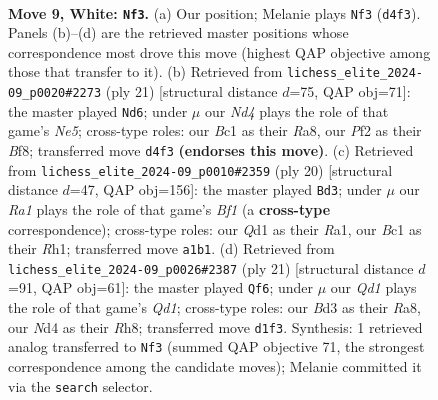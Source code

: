 \documentclass[11pt]{article}
\begin{document}
\clearpage

\begin{figure}[p]\centering
\begin{subfigure}{0.46\textwidth}\centering
\resizebox{\linewidth}{!}{%
\newchessgame
\chessboard[
  setfen={rnb2rk1/pp3ppp/4pn2/3q4/1b1N4/2NBP3/PP3PPP/R1BQK2R w KQ - 0 9},
  showmover=false,
  pgfstyle=straightmove, color=movearrow, markmove={d4-f3}
]}
\caption{}
\end{subfigure}\hfill
\begin{subfigure}{0.46\textwidth}\centering
\resizebox{\linewidth}{!}{%
\newchessgame
\chessboard[
  setfen={r2qkb1r/ppp3p1/2n4p/1B3b2/4n3/2N2Q2/PPP2PPP/R1B2RK1 b kq - 1 11},
  showmover=false,
  pgfstyle=straightmove, color=movearrow, markmove={e4-d6}
]}
\caption{}
\end{subfigure}
\\[4pt]
\begin{subfigure}{0.46\textwidth}\centering
\resizebox{\linewidth}{!}{%
\newchessgame
\chessboard[
  setfen={rnb2rk1/pp3pp1/4pn1p/8/1b1Nq2B/2N1P3/PPQ2PPP/R3KB1R w KQ - 1 11},
  showmover=false,
  pgfstyle=straightmove, color=movearrow, markmove={f1-d3}
]}
\caption{}
\end{subfigure}\hfill
\begin{subfigure}{0.46\textwidth}\centering
\resizebox{\linewidth}{!}{%
\newchessgame
\chessboard[
  setfen={r2qk2r/pp3pQp/4b3/2pn4/1b6/2N3P1/PP2PPBP/R1B1K2R b KQkq - 0 11},
  showmover=false,
  pgfstyle=straightmove, color=movearrow, markmove={d8-f6}
]}
\caption{}
\end{subfigure}
\caption{\textbf{Move 9, White: \texttt{Nf3}.} (a) Our position; Melanie plays \texttt{Nf3} (\texttt{d4f3}). Panels (b)--(d) are the retrieved master positions whose correspondence most drove this move (highest QAP objective among those that transfer to it). (b) Retrieved from \texttt{lichess\_elite\_2024-09\_p0020\#2273} (ply 21) [structural distance $d$=75, QAP obj=71]: the master played \texttt{Nd6}; under $\mu$ our \emph{Nd4} plays the role of that game's \emph{Ne5}; cross-type roles: our \emph{B}c1 as their \emph{R}a8, our \emph{P}f2 as their \emph{B}f8; transferred move \texttt{d4f3} \textbf{(endorses this move)}. (c) Retrieved from \texttt{lichess\_elite\_2024-09\_p0010\#2359} (ply 20) [structural distance $d$=47, QAP obj=156]: the master played \texttt{Bd3}; under $\mu$ our \emph{Ra1} plays the role of that game's \emph{Bf1} (a \textbf{cross-type} correspondence); cross-type roles: our \emph{Q}d1 as their \emph{R}a1, our \emph{B}c1 as their \emph{R}h1; transferred move \texttt{a1b1}. (d) Retrieved from \texttt{lichess\_elite\_2024-09\_p0026\#2387} (ply 21) [structural distance $d$=91, QAP obj=61]: the master played \texttt{Qf6}; under $\mu$ our \emph{Qd1} plays the role of that game's \emph{Qd1}; cross-type roles: our \emph{B}d3 as their \emph{R}a8, our \emph{N}d4 as their \emph{R}h8; transferred move \texttt{d1f3}. Synthesis: 1 retrieved analog transferred to \texttt{Nf3} (summed QAP objective 71, the strongest correspondence among the candidate moves); Melanie committed it via the \texttt{search} selector.}
\label{fig:thought-m16}
\end{figure}
\end{document}
